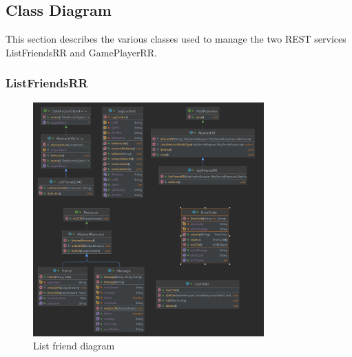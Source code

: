\subsection{Class Diagram}
This section describes the various classes used to manage the two REST services ListFriendsRR and GamePlayerRR.
\subsubsection{ListFriendsRR}
\begin{figure}[htb] 
    \centering
    \includegraphics[height=9cm]{images/class_diagram/list_friend_diagram.png}
    \caption{List friend diagram}
    \label{fig:list_friend_diagram}
\end{figure}

